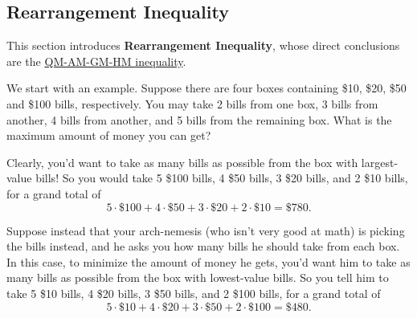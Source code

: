 \subsection{Rearrangement Inequality}
This section introduces \textbf{Rearrangement Inequality}, whose direct conclusions are the \href{https://en.wikipedia.org/wiki/QM-AM-GM-HM_Inequalities}{QM-AM-GM-HM inequality}.

We start with an example. Suppose there are four boxes containing \$10, \$20, \$50 and \$100 bills, respectively. You may take 2 bills from one box, 3 bills from another, 4 bills from another, and 5 bills from the remaining box. What is the maximum amount of money you can get?

Clearly, you’d want to take as many bills as possible from the box with largest-value bills! So you would take 5 \$100 bills, 4 \$50 bills, 3 \$20 bills, and 2 \$10 bills, for a grand total of
\begin{equation}\label{eq4.3}
5 \cdot \$100 + 4 \cdot \$50 + 3 \cdot \$20 + 2 \cdot \$10 = \$780.
\end{equation}

Suppose instead that your arch-nemesis (who isn't very good at math) is picking the bills instead, and he asks you how many bills he should take from each box. In this case, to minimize the amount of money he gets, you’d want him to take as many bills as possible from the box with lowest-value bills. So you tell him to take 5 \$10 bills, 4 \$20 bills, 3 \$50 bills, and 2 \$100 bills, for a grand total of
\begin{equation}\label{eq4.4}
5 \cdot \$10 + 4 \cdot \$20 + 3 \cdot \$50 + 2 \cdot \$100 = \$480.
\end{equation}

